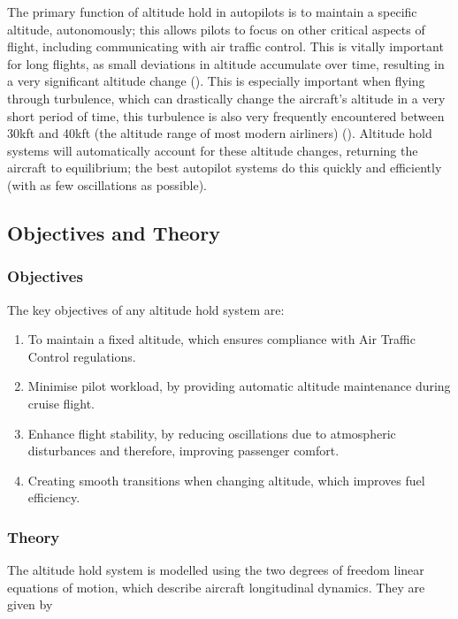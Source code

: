 \documentclass[stu, a4paper, 12pt, floatsintext]{apa7}
\numberwithin{figure}{section}
\numberwithin{table}{section}
\numberwithin{equation}{section}
\begin{document}
The primary function of altitude hold in autopilots is to maintain a specific altitude, autonomously; this allows pilots to focus on other critical aspects of flight, including communicating with air traffic control. This is vitally important for long flights, as small deviations in altitude accumulate over time, resulting in a very significant altitude change (\cite{nasa2017}). This is especially important when flying through turbulence, which can drastically change the aircraft’s altitude in a very short period of time, this turbulence is also very frequently encountered between 30kft and 40kft (the altitude range of most modern airliners) (\cite{nasa2017}). Altitude hold systems will automatically account for these altitude changes, returning the aircraft to equilibrium; the best autopilot systems do this quickly and efficiently (with as few oscillations as possible).

\newpage

\subsection{Objectives and Theory}

\subsubsection{Objectives}
The key objectives of any altitude hold system are: 
\begin{enumerate}
    \item To maintain a fixed altitude, which ensures compliance with Air Traffic Control regulations.
    \item Minimise pilot workload, by providing automatic altitude maintenance during cruise flight.
    \item Enhance flight stability, by reducing oscillations due to atmospheric disturbances and therefore, improving passenger comfort.
    \item Creating smooth transitions when changing altitude, which improves fuel efficiency. 
\end{enumerate}

\subsubsection{Theory}

The altitude hold system is modelled using the two degrees of freedom linear equations of motion, which describe aircraft longitudinal dynamics. They are given by
\end{document}
